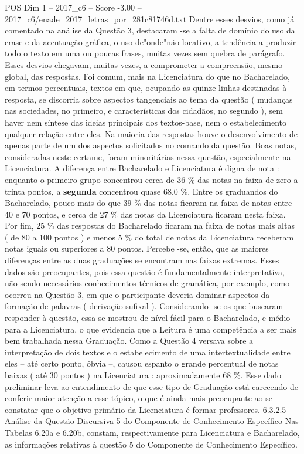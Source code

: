 \begin{textsample}{POS Dim 1 – 2017\_c6 – Score -3.00 – 2017\_c6/enade\_2017\_letras\_por\_281c81746d.txt}
Dentre esses desvios, como já comentado na análise da Questão 3, destacaram -se a falta de domínio do uso da crase e da acentuação gráfica, o uso de"onde"não locativo, a tendência a produzir todo o texto em uma ou poucas frases, muitas vezes sem quebra de parágrafo.
Esses desvios chegavam, muitas vezes, a comprometer a compreensão, mesmo global, das respostas.
Foi comum, mais na Licenciatura do que no Bacharelado, em termos percentuais, textos em que, ocupando as quinze linhas destinadas à resposta, se discorria sobre aspectos tangenciais ao tema da questão ( mudanças nas sociedades, no primeiro, e características dos cidadãos, no segundo ), sem haver nem síntese das ideias principais dos textos-base, nem o estabelecimento qualquer relação entre eles.
Na maioria das respostas houve o desenvolvimento de apenas parte de um dos aspectos solicitados no comando da questão.
Boas notas, consideradas neste certame, foram minoritárias nessa questão, especialmente na Licenciatura.
A diferença entre Bacharelado e Licenciatura é digna de nota : enquanto o primeiro grupo concentrou cerca de 36 \% das notas na faixa de zero a trinta pontos, a \textbf{segunda} concentrou quase 68,0 \%.
Entre os graduandos do Bacharelado, pouco mais do que 39 \% das notas ficaram na faixa de notas entre 40 e 70 pontos, e cerca de 27 \% das notas da Licenciatura ficaram nesta faixa.
Por fim, 25 \% das respostas do Bacharelado ficaram na faixa de notas mais altas ( de 80 a 100 pontos ) e menos 5 \% do total de notas da Licenciatura receberam notas iguais ou superiores a 80 pontos.
Percebe -se, então, que as maiores diferenças entre as duas graduações se encontram nas faixas extremas.
Esses dados são preocupantes, pois essa questão é fundamentalmente interpretativa, não sendo necessários conhecimentos técnicos de gramática, por exemplo, como ocorreu na Questão 3, em que o participante deveria dominar aspectos da formação de palavras ( derivação sufixal ).
Considerando -se os que buscaram responder à questão, essa se mostrou de nível fácil para o Bacharelado, e médio para a Licenciatura, o que evidencia que a Leitura é uma competência a ser mais bem trabalhada nessa Graduação.
Como a Questão 4 versava sobre a interpretação de dois textos e o estabelecimento de uma intertextualidade entre eles – até certo ponto, óbvia –, causou espanto o grande percentual de notas baixas ( até 30 pontos ) na Licenciatura : aproximadamente 68 \%.
Esse dado preliminar leva ao entendimento de que esse tipo de Graduação está carecendo de conferir maior atenção a esse tópico, o que é ainda mais preocupante ao se constatar que o objetivo primário da Licenciatura é formar professores. 6.3.2.5 Análise da Questão Discursiva 5 do Componente de Conhecimento Específico Nas Tabelas 6.20a e 6.20b, constam, respectivamente para Licenciatura e Bacharelado, as informações relativas à questão 5 do Componente de Conhecimento Específico.

\end{textsample}
